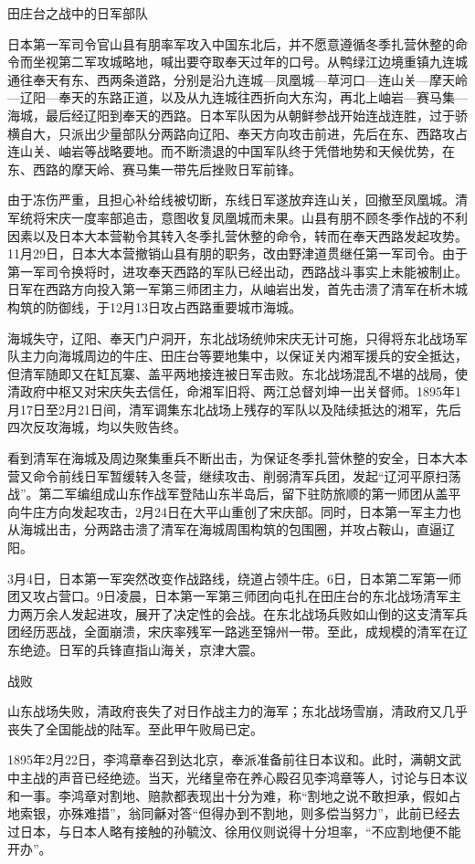 \documentclass[12pt,UTF8]{ctexbook}
\begin{document}
田庄台之战中的日军部队

日本第一军司令官山县有朋率军攻入中国东北后，并不愿意遵循冬季扎营休整的命令而坐视第二军攻城略地，喊出要夺取奉天过年的口号。从鸭绿江边境重镇九连城通往奉天有东、西两条道路，分别是沿九连城—凤凰城—草河口—连山关—摩天岭—辽阳—奉天的东路正道，以及从九连城往西折向大东沟，再北上岫岩—赛马集—海城，最后经辽阳到奉天的西路。日本军队因为从朝鲜参战开始连战连胜，过于骄横自大，只派出少量部队分两路向辽阳、奉天方向攻击前进，先后在东、西路攻占连山关、岫岩等战略要地。而不断溃退的中国军队终于凭借地势和天候优势，在东、西路的摩天岭、赛马集一带先后挫败日军前锋。

由于冻伤严重，且担心补给线被切断，东线日军遂放弃连山关，回撤至凤凰城。清军统将宋庆一度率部追击，意图收复凤凰城而未果。山县有朋不顾冬季作战的不利因素以及日本大本营勒令其转入冬季扎营休整的命令，转而在奉天西路发起攻势。11月29日，日本大本营撤销山县有朋的职务，改由野津道贯继任第一军司令。由于第一军司令换将时，进攻奉天西路的军队已经出动，西路战斗事实上未能被制止。日军在西路方向投入第一军第三师团主力，从岫岩出发，首先击溃了清军在析木城构筑的防御线，于12月13日攻占西路重要城市海城。

海城失守，辽阳、奉天门户洞开，东北战场统帅宋庆无计可施，只得将东北战场军队主力向海城周边的牛庄、田庄台等要地集中，以保证关内湘军援兵的安全抵达，但清军随即又在缸瓦寨、盖平两地接连被日军击败。东北战场混乱不堪的战局，使清政府中枢又对宋庆失去信任，命湘军旧将、两江总督刘坤一出关督师。1895年1月17日至2月21日间，清军调集东北战场上残存的军队以及陆续抵达的湘军，先后四次反攻海城，均以失败告终。

看到清军在海城及周边聚集重兵不断出击，为保证冬季扎营休整的安全，日本大本营又命令前线日军暂缓转入冬营，继续攻击、削弱清军兵团，发起“辽河平原扫荡战”。第二军编组成山东作战军登陆山东半岛后，留下驻防旅顺的第一师团从盖平向牛庄方向发起攻击，2月24日在大平山重创了宋庆部。同时，日本第一军主力也从海城出击，分两路击溃了清军在海城周围构筑的包围圈，并攻占鞍山，直逼辽阳。

3月4日，日本第一军突然改变作战路线，绕道占领牛庄。6日，日本第二军第一师团又攻占营口。9日凌晨，日本第一军第三师团向屯扎在田庄台的东北战场清军主力两万余人发起进攻，展开了决定性的会战。在东北战场兵败如山倒的这支清军兵团经历恶战，全面崩溃，宋庆率残军一路逃至锦州一带。至此，成规模的清军在辽东绝迹。日军的兵锋直指山海关，京津大震。

战败

山东战场失败，清政府丧失了对日作战主力的海军；东北战场雪崩，清政府又几乎丧失了全国能战的陆军。至此甲午败局已定。

1895年2月22日，李鸿章奉召到达北京，奉派准备前往日本议和。此时，满朝文武中主战的声音已经绝迹。当天，光绪皇帝在养心殿召见李鸿章等人，讨论与日本议和一事。李鸿章对割地、赔款都表现出十分为难，称“割地之说不敢担承，假如占地索银，亦殊难措”，翁同龢对答“但得办到不割地，则多偿当努力”，此前已经去过日本，与日本人略有接触的孙毓汶、徐用仪则说得十分坦率，“不应割地便不能开办”。
\end{document}

